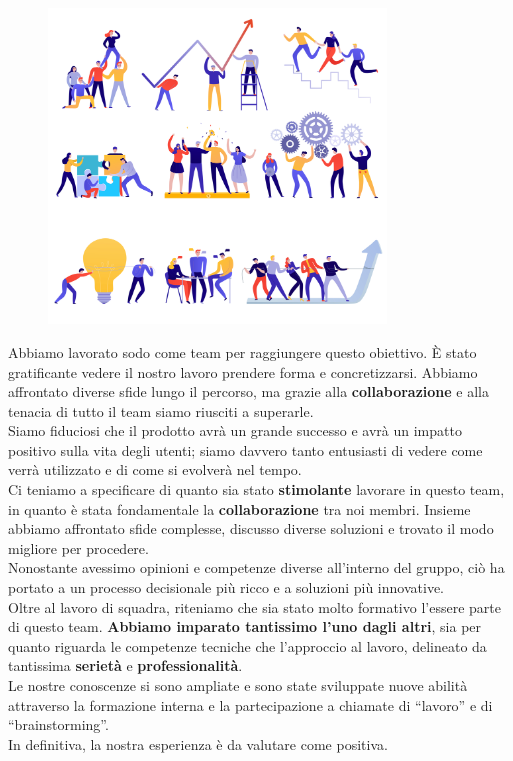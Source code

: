 \documentclass{article}
\begin{document}
	\begin{figure}[H]
		\centering
		\includegraphics[width=0.8\textwidth]{Immagini/31708}
	\end{figure}
	Abbiamo lavorato sodo come team per raggiungere questo obiettivo.
	È stato gratificante vedere il nostro lavoro prendere forma e concretizzarsi. Abbiamo affrontato diverse sfide lungo il percorso, ma grazie alla \textbf{collaborazione} e alla tenacia di tutto il team siamo riusciti a superarle.\\
	Siamo fiduciosi che il prodotto avrà un grande successo e avrà un impatto positivo sulla vita degli utenti; siamo davvero tanto entusiasti di vedere come verrà utilizzato e di come si evolverà nel tempo.\\
	Ci teniamo a specificare di quanto sia stato \textbf{stimolante} lavorare in questo team, in quanto è stata fondamentale la \textbf{collaborazione} tra noi membri. Insieme abbiamo affrontato sfide complesse, discusso diverse soluzioni e trovato il modo migliore per procedere.
	\\
	Nonostante avessimo opinioni e competenze diverse all’interno del gruppo, ciò ha portato a un processo decisionale più ricco e a soluzioni più innovative.\\
	Oltre al lavoro di squadra, riteniamo che sia stato molto formativo l'essere parte di questo team.
	\textbf{Abbiamo imparato tantissimo l’uno dagli altri}, sia per quanto riguarda le competenze tecniche che l’approccio al lavoro, delineato da tantissima \textbf{serietà} e \textbf{professionalità}.\\
	Le nostre conoscenze si sono ampliate e sono state sviluppate nuove abilità attraverso la formazione interna e la partecipazione a chiamate di “lavoro” e di “brainstorming”.\\
	In definitiva, la nostra esperienza è da valutare come positiva. 
	
		
\end{document}
